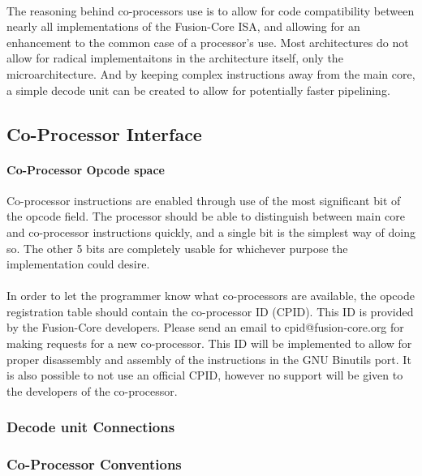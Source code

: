 \documentclass[letterpaper, 11pt]{article}
\begin{document}
\paragraph{} The reasoning behind co-processors use is to allow for code compatibility between nearly all implementations of the Fusion-Core ISA, and
allowing for an enhancement to the common case of a processor's use. Most architectures do not allow for radical implementaitons in the architecture itself,
only the microarchitecture. And by keeping complex instructions away from the main core, a simple decode unit can be created to allow for potentially faster
pipelining. 

\subsection{Co-Processor Interface}

\paragraph{Co-Processor Opcode space} Co-processor instructions are enabled through use of the most significant bit of the opcode field. 
The processor should be able to distinguish between main core and co-processor instructions quickly, and a single bit is the simplest way of doing so.
The other 5 bits are completely usable for whichever purpose the implementation could desire.

\paragraph{} In order to let the programmer know what co-processors are available, the opcode registration table should contain the co-processor ID (CPID).
This ID is provided by the Fusion-Core developers. Please send an email to cpid@fusion-core.org for making requests for a new co-processor.
This ID will be implemented to allow for proper disassembly and assembly of the instructions in the GNU Binutils port. It is also possible to not use an official
CPID, however no support will be given to the developers of the co-processor.

\subsubsection{Decode unit Connections}
\subsubsection{Co-Processor Conventions}
\end{document}
